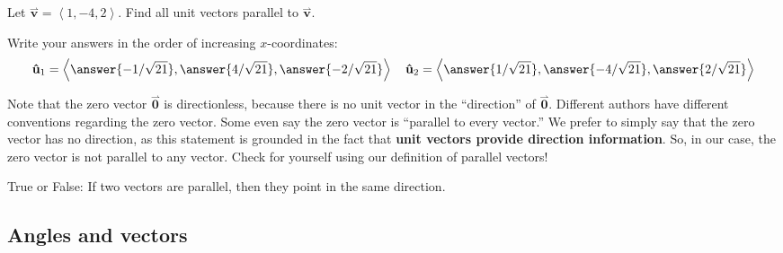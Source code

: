 \documentclass{ximera}
\begin{document}
\begin{question}
  Let $\overset{\rightharpoonup}{\mathbf{v}} = \left\langle 1,-4,2 \right\rangle$. Find all unit vectors parallel to $\overset{\rightharpoonup}{\mathbf{v}}$.
  \begin{prompt}
    Write your answers in the order of increasing $x$-coordinates:
    \[
    \mathbf{\hat{u}}_1 = \left\langle \answer{-1/\sqrt{21}},\answer{4/\sqrt{21}},\answer{-2/\sqrt{21}} \right\rangle \quad \mathbf{\hat{u}}_2 = \left\langle \answer{1/\sqrt{21}},\answer{-4/\sqrt{21}},\answer{2/\sqrt{21}} \right\rangle
    \]
  \end{prompt}
\end{question}


Note that the zero vector $\overset{\rightharpoonup}{\mathbf{0}}$ is directionless, because
there is no unit vector in the ``direction'' of $\overset{\rightharpoonup}{\mathbf{0}}$. Different
authors have different conventions regarding the zero vector. Some
even say the zero vector is ``parallel to every vector.'' We prefer to simply say
that the zero vector has no direction, as this statement is grounded in the fact
that \textbf{unit vectors provide direction information}.  So, in our case, 
the zero vector is not parallel to any vector.  Check for yourself 
using our definition of parallel vectors!

\begin{question}
  True or False: If two vectors are parallel, then they point in the same direction.
  \begin{prompt}
    \begin{multipleChoice}
    \end{multipleChoice}
  \end{prompt}
\end{question}





\subsection{Angles and vectors}
\end{document}
